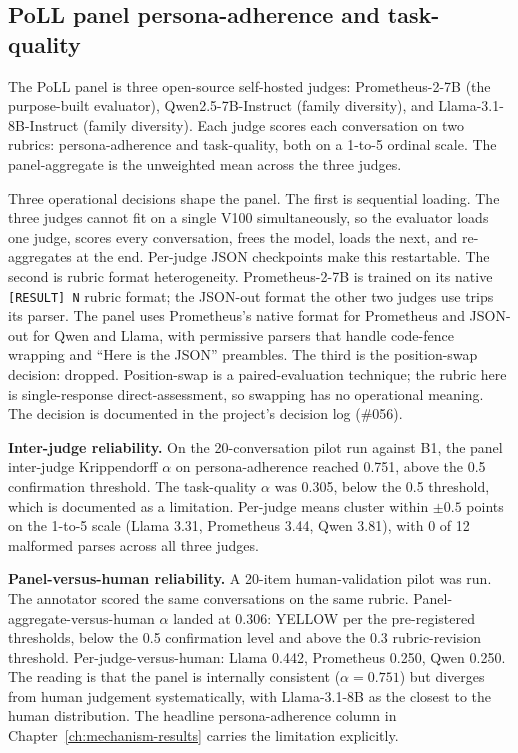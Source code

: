 \subsection{PoLL panel persona-adherence and task-quality}

The PoLL panel\autocite{poll2024} is three open-source self-hosted judges: Prometheus-2-7B (the purpose-built evaluator)\autocite{prometheus2024}, Qwen2.5-7B-Instruct (family diversity), and Llama-3.1-8B-Instruct (family diversity). Each judge scores each conversation on two rubrics: persona-adherence and task-quality, both on a 1-to-5 ordinal scale. The panel-aggregate is the unweighted mean across the three judges.

Three operational decisions shape the panel. The first is sequential loading. The three judges cannot fit on a single V100 simultaneously, so the evaluator loads one judge, scores every conversation, frees the model, loads the next, and re-aggregates at the end. Per-judge JSON checkpoints make this restartable. The second is rubric format heterogeneity. Prometheus-2-7B is trained on its native \texttt{[RESULT] N} rubric format; the JSON-out format the other two judges use trips its parser. The panel uses Prometheus's native format for Prometheus and JSON-out for Qwen and Llama, with permissive parsers that handle code-fence wrapping and ``Here is the JSON'' preambles. The third is the position-swap decision: dropped. Position-swap is a paired-evaluation technique; the rubric here is single-response direct-assessment, so swapping has no operational meaning. The decision is documented in the project's decision log (\#056).

\textbf{Inter-judge reliability.} On the 20-conversation pilot run against B1, the panel inter-judge Krippendorff $\alpha$ on persona-adherence reached 0.751, above the 0.5 confirmation threshold. The task-quality $\alpha$ was 0.305, below the 0.5 threshold, which is documented as a limitation. Per-judge means cluster within $\pm 0.5$ points on the 1-to-5 scale (Llama 3.31, Prometheus 3.44, Qwen 3.81), with 0 of 12 malformed parses across all three judges.

\textbf{Panel-versus-human reliability.} A 20-item human-validation pilot was run. The annotator scored the same conversations on the same rubric. Panel-aggregate-versus-human $\alpha$ landed at 0.306: YELLOW per the pre-registered thresholds, below the 0.5 confirmation level and above the 0.3 rubric-revision threshold. Per-judge-versus-human: Llama 0.442, Prometheus 0.250, Qwen 0.250. The reading is that the panel is internally consistent ($\alpha = 0.751$) but diverges from human judgement systematically, with Llama-3.1-8B as the closest to the human distribution. The headline persona-adherence column in Chapter~\ref{ch:mechanism-results} carries the limitation explicitly.

